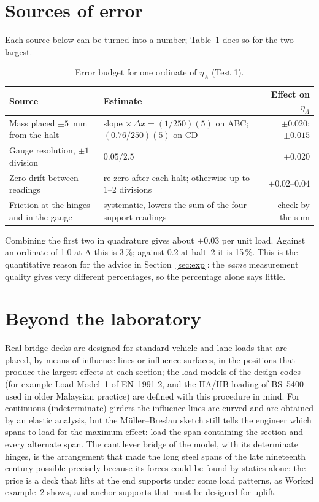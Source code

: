 \documentclass[11pt,a4paper]{article}
\newcommand{\il}[1]{\eta_{#1}}
\begin{document}
\section{Sources of error}
\label{sec:err}
Each source below can be turned into a number; Table~\ref{tab:err} does so for the two largest.

\begin{table}[h]
\centering\small
\caption{Error budget for one ordinate of $\il{A}$ (Test 1).}
\label{tab:err}
\begin{tabular}{@{}p{5.2cm}p{5.4cm}r@{}}
\toprule
Source & Estimate & Effect on $\il{A}$\\
\midrule
Mass placed $\pm 5$~mm from the halt & slope $\times\,\Delta x = (1/250)(5)$ on ABC; $(0.76/250)(5)$ on CD & $\pm 0.020$; $\pm 0.015$\\
Gauge resolution, $\pm 1$ division & $0.05/2.5$ & $\pm 0.020$\\
Zero drift between readings & re-zero after each halt; otherwise up to 1--2 divisions & $\pm 0.02$--$0.04$\\
Friction at the hinges and in the gauge & systematic, lowers the sum of the four support readings & check by the sum\\
\bottomrule
\end{tabular}
\end{table}

Combining the first two in quadrature gives about $\pm 0.03$ per unit load. Against an ordinate of 1.0 at A this is 3\,\%; against 0.2 at halt~2 it is 15\,\%. This is the quantitative reason for the advice in Section~\ref{sec:exp}: the \emph{same} measurement quality gives very different percentages, so the percentage alone says little.

\section{Beyond the laboratory}
Real bridge decks are designed for standard vehicle and lane loads that are placed, by means of influence lines or influence surfaces, in the positions that produce the largest effects at each section; the load models of the design codes (for example Load Model~1 of EN~1991-2, and the HA/HB loading of BS~5400 used in older Malaysian practice) are defined with this procedure in mind. For continuous (indeterminate) girders the influence lines are curved and are obtained by an elastic analysis, but the Müller--Breslau sketch still tells the engineer which spans to load for the maximum effect: load the span containing the section and every alternate span. The cantilever bridge of the model, with its determinate hinges, is the arrangement that made the long steel spans of the late nineteenth century possible precisely because its forces could be found by statics alone; the price is a deck that lifts at the end supports under some load patterns, as Worked example~2 shows, and anchor supports that must be designed for uplift.
\end{document}
